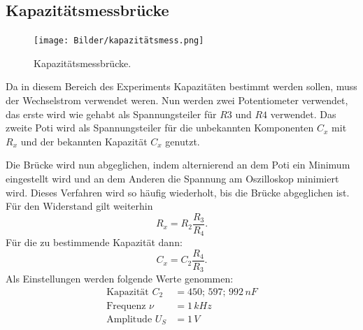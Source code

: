 \subsection{Kapazitätsmessbrücke}
\begin{figure}[H]
    \centering
        \centering
        \texttt{[image: Bilder/kapazitätsmess.png]}
        \caption{Kapazitätsmessbrücke. \cite{anleitung}}
    \hfill
    \label{fig:f3}
\end{figure}
\noindent Da in diesem Bereich des Experiments Kapazitäten bestimmt werden sollen, 
muss der Wechselstrom verwendet weren. Nun werden zwei Potentiometer verwendet, 
das erste wird wie gehabt als Spannungsteiler für $R3$ und $R4$ verwendet. Das 
zweite Poti wird als Spannungsteiler für die unbekannten Komponenten $C_x$ mit 
$R_x$ und der bekannten Kapazität $C_x$ genutzt.
\par\vspace{0.5em}
Die Brücke wird nun abgeglichen, indem alternierend an dem Poti ein Minimum 
eingestellt wird und an dem Anderen die Spannung am Oszilloskop minimiert wird.
Dieses Verfahren wird so häufig wiederholt, bis die Brücke abgeglichen ist.
Für den Widerstand gilt weiterhin
\begin{equation}
    R_x = R_2 \frac{R_3}{R_4}.
\end{equation}
Für die zu bestimmende Kapazität dann:
\begin{equation}
    \label{eqn:2}
    C_x = C_2 \frac{R_4}{R_3}.
\end{equation}
\noindent Als Einstellungen werden folgende Werte genommen:
\begin{align*}
    \label{eqn:werte1}
    \text{Kapazität } C_2 &= 450;\, 597;\, 992\, nF \\
    \text{Frequenz } \nu &= 1\,kHz \\
    \text{Amplitude } U_S &= 1\,V \\
\end{align*}


